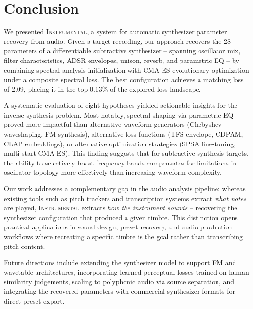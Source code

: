 
\section{Conclusion}

We presented \textsc{Instrumental}, a system for automatic synthesizer parameter recovery from audio. Given a target recording, our approach recovers the 28 parameters of a differentiable subtractive synthesizer -- spanning oscillator mix, filter characteristics, ADSR envelopes, unison, reverb, and parametric EQ -- by combining spectral-analysis initialization with CMA-ES evolutionary optimization under a composite spectral loss. The best configuration achieves a matching loss of 2.09, placing it in the top 0.13\% of the explored loss landscape.

A systematic evaluation of eight hypotheses yielded actionable insights for the inverse synthesis problem. Most notably, spectral shaping via parametric EQ proved more impactful than alternative waveform generators (Chebyshev waveshaping, FM synthesis), alternative loss functions (TFS envelope, CDPAM, CLAP embeddings), or alternative optimization strategies (SPSA fine-tuning, multi-start CMA-ES). This finding suggests that for subtractive synthesis targets, the ability to selectively boost frequency bands compensates for limitations in oscillator topology more effectively than increasing waveform complexity.

Our work addresses a complementary gap in the audio analysis pipeline: whereas existing tools such as pitch trackers and transcription systems extract \emph{what notes} are played, \textsc{Instrumental} extracts \emph{how the instrument sounds} -- recovering the synthesizer configuration that produced a given timbre. This distinction opens practical applications in sound design, preset recovery, and audio production workflows where recreating a specific timbre is the goal rather than transcribing pitch content.

Future directions include extending the synthesizer model to support FM and wavetable architectures, incorporating learned perceptual losses trained on human similarity judgements, scaling to polyphonic audio via source separation, and integrating the recovered parameters with commercial synthesizer formats for direct preset export.
